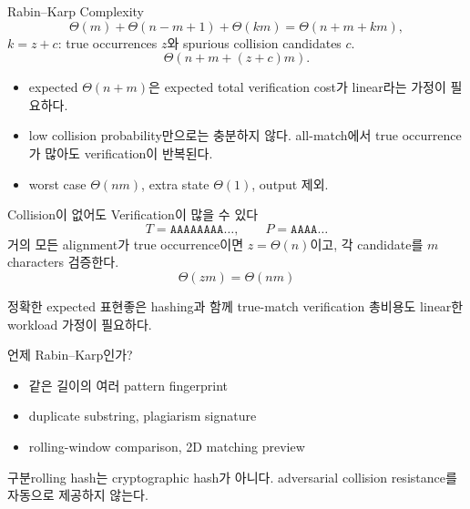 \begin{frame}{Rabin--Karp Complexity}
\[
\Theta(m)+\Theta(n-m+1)+\Theta(km)
=\Theta(n+m+km),
\]
\(k=z+c\): true occurrences \(z\)와 spurious collision candidates \(c\).
\[
\Theta(n+m+(z+c)m).
\]
\begin{itemize}
\item expected \(\Theta(n+m)\)은 expected total verification cost가 linear라는 가정이 필요하다.
\item low collision probability만으로는 충분하지 않다. all-match에서 true occurrence가 많아도 verification이 반복된다.
\item worst case \(\Theta(nm)\), extra state \(\Theta(1)\), output 제외.
\end{itemize}
\end{frame}
\begin{frame}{Collision이 없어도 Verification이 많을 수 있다}
\[
T=\texttt{AAAAAAAA}\ldots,\qquad P=\texttt{AAAA}\ldots
\]
거의 모든 alignment가 true occurrence이면 \(z=\Theta(n)\)이고, 각 candidate를 \(m\) characters 검증한다.
\[
\Theta(zm)=\Theta(nm)
\]
\begin{alertblock}{정확한 expected 표현}좋은 hashing과 함께 true-match verification 총비용도 linear한 workload 가정이 필요하다.\end{alertblock}
\end{frame}
\begin{frame}{언제 Rabin--Karp인가?}
\begin{itemize}\item 같은 길이의 여러 pattern fingerprint\item duplicate substring, plagiarism signature\item rolling-window comparison, 2D matching preview\end{itemize}
\begin{alertblock}{구분}rolling hash는 cryptographic hash가 아니다. adversarial collision resistance를 자동으로 제공하지 않는다.\end{alertblock}
\end{frame}
